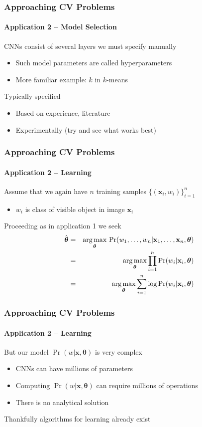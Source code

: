 \documentclass[xetex,professionalfont]{beamer}
\DeclareMathOperator*{\argmax}{arg\,max}
\renewcommand{\vec}[1]{\ensuremath{\mathbf{#1}}}
\newcommand{\vx}{\vec{x}}
\newcommand{\bth}{\boldsymbol{\theta}}
\renewcommand\emph[1]{\textcolor{tuwcvl_inf_red}{#1}}
\begin{document}

\begin{frame}
\frametitle{Approaching CV Problems}
\framesubtitle{Application 2 -- Model Selection}

CNNs consist of several layers we must specify manually
\begin{itemize}
    \item Such model parameters are called \emph{hyperparameters}
    \item More familiar example: $k$ in $k$-means
\end{itemize}

\bigskip
Typically specified
\begin{itemize}
    \item Based on experience, literature
    \item Experimentally (try and see what works best)
\end{itemize}

\end{frame}


\begin{frame}
\frametitle{Approaching CV Problems}
\framesubtitle{Application 2 -- Learning}

Assume that we again have $n$ training samples $\{(\vx_i,w_i)\}_{i=1}^n$
\begin{itemize}
    \item $w_i$ is class of visible object in image $\vx_i$
\end{itemize}

\bigskip
Proceeding as in application 1 we seek %
\begin{eqnarray*}
  \hat{\bth}&=&\argmax_{\bth}\,\Pr(w_1,\dots,w_n|\vx_1,\dots,\vx_n,\bth) \\\medskip
  &=&\argmax_{\bth}\prod_{i=1}^n \Pr(w_i|\vx_i,\bth) \\\medskip
  &=&\argmax_{\bth}\sum_{i=1}^n \log\Pr(w_i|\vx_i,\bth)
\end{eqnarray*}

\end{frame}


\begin{frame}
\frametitle{Approaching CV Problems}
\framesubtitle{Application 2 -- Learning}

But our model $\Pr(w|\vx,\bth)$ is very complex
\begin{itemize}
    \item CNNs can have millions of parameters
    \item Computing $\Pr(w|\vx,\bth)$ can require millions of operations
    \item There is no analytical solution
\end{itemize}

\bigskip
Thankfully algorithms for learning already exist

\end{frame}
\end{document}
